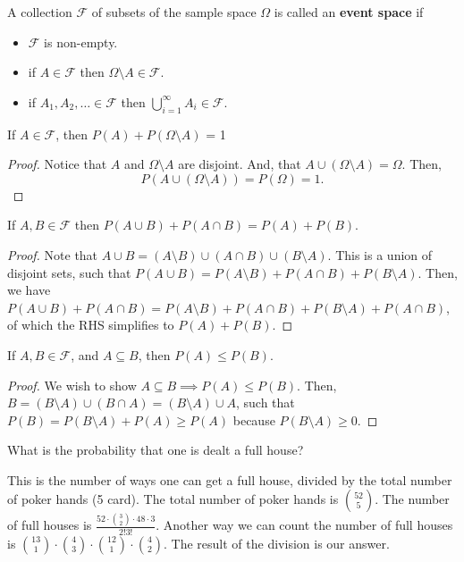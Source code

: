 
\begin{definition}
	A collection \( \mathcal{F} \) of subsets of the sample space \( \Omega  \) is called an \textbf{event space} if 
	\begin{itemize}
		\item \( \mathcal{F} \) is non-empty.
		\item if \( A \in \mathcal{F} \) then \( \Omega \setminus A \in \mathcal{F} \).
		\item if \( A_{1},A_{2},\ldots \in \mathcal{F} \) then \( \bigcup_{i=1}^{\infty}A_i \in \mathcal{F} \).
	\end{itemize}
\end{definition}

\begin{theorem}
	If \( A \in \mathcal{F} \), then \( P(A) + P(\Omega \setminus A) \) = 1
\end{theorem}
\begin{proof}
	Notice that \( A \) and \( \Omega  \setminus  A \) are disjoint. And, that \( A \cup (\Omega  \setminus A) = \Omega \). Then,	\[
		P(A \cup (\Omega \setminus A)) = P(\Omega ) = 1
	.\] 
\end{proof}

\begin{theorem}
	If \( A,B \in \mathcal{F} \) then \( P(A \cup B) + P(A \cap B) = P(A) + P(B)\).
\end{theorem}
\begin{proof}
	Note that \( A \cup B = (A \setminus B) \cup (A \cap B) \cup (B \setminus A) \). This is a union of disjoint sets, such that \( P(A \cup B) = P(A \setminus B) + P(A \cap B) + P(B \setminus A) \). Then, we have \( P(A \cup B) + P(A \cap B) = P(A \setminus B) + P(A \cap B) + P(B \setminus A) + P(A \cap B)\), of which the RHS simplifies to \( P(A) + P(B) \).
\end{proof}

\begin{theorem}
	If \( A, B \in \mathcal{F} \), and \( A \subseteq B \), then \( P(A) \le  P(B) \).
\end{theorem}
\begin{proof}
	We wish to show \( A \subseteq B \implies P(A) \le P(B) \). Then, \( B = (B \setminus A) \cup  (B \cap A) = (B \setminus A) \cup  A \), such that \( P(B) = P(B \setminus A) + P(A) \ge P(A)\) because \( P(B \setminus A) \ge  0 \).
\end{proof}

\begin{eg}
	What is the probability that one is dealt a full house?
\end{eg}
\begin{explanation}
	This is the number of ways one can get a full house, divided by the total number of poker hands (5 card). The total number of poker hands is \( \binom{52}{5} \). The number of full houses is \( \frac{52 \cdot \binom{3}{2} \cdot 48 \cdot 3}{2!3!} \). Another way we can count the number of full houses is \( \binom{13}{1} \cdot \binom{4}{3} \cdot \binom{12}{1} \cdot \binom{4}{2}\). The result of the division is our answer.
\end{explanation}

